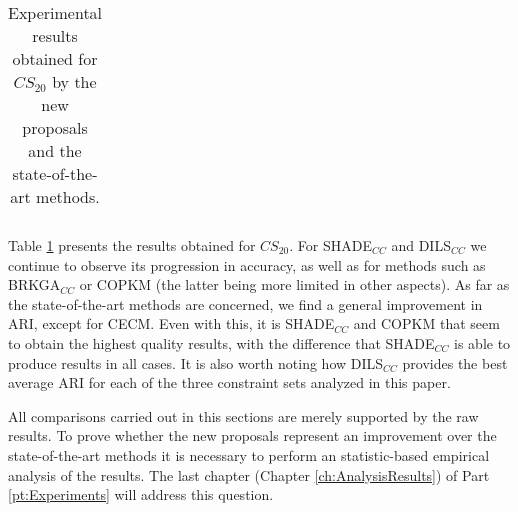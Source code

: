 \begin{table}[!h]
{\begin{tabular}{lcccccccc}
	\end{tabular}}
	
	\caption{Experimental results obtained for $CS_{20}$ by the new proposals and the state-of-the-art methods.}
	\label{tab:resultsSOTA20}
\end{table}

Table \ref{tab:resultsSOTA20} presents the results obtained for $CS_{20}$. For \acs{SHADE}$_{CC}$ and \acs{DILS}$_{CC}$ we continue to observe its progression in accuracy, as well as for methods such as \acs{BRKGA}$_{CC}$ or \acs{COPKM} (the latter being more limited in other aspects). As far as the state-of-the-art methods are concerned, we find a general improvement in \acs{ARI}, except for CECM. Even with this, it is \acs{SHADE}$_{CC}$ and \acs{COPKM} that seem to obtain the highest quality results, with the difference that \acs{SHADE}$_{CC}$ is able to produce results in all cases. It is also worth noting how \acs{DILS}$_{CC}$ provides the best average \acs{ARI} for each of the three constraint sets analyzed in this paper.

\newpage

All comparisons carried out in this sections are merely supported by the raw results. To prove whether the new proposals represent an improvement over the state-of-the-art methods it is necessary to perform an statistic-based empirical analysis of the results. The last chapter (Chapter \ref{ch:AnalysisResults}) of Part \ref{pt:Experiments} will address this question.




















